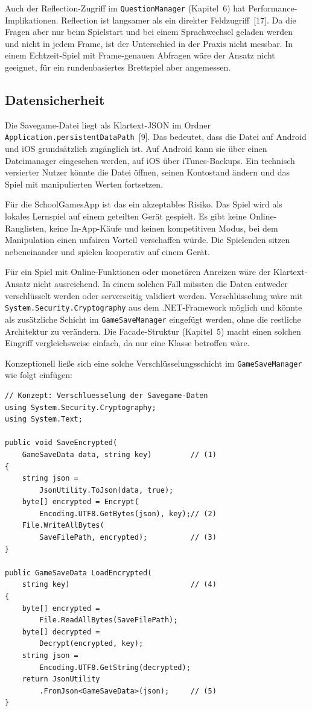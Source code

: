 \documentclass[12pt,a4paper]{article}
\begin{document}
Auch der Reflection-Zugriff im \texttt{QuestionManager} (Kapitel~6) hat Performance-Implikationen. Reflection ist langsamer als ein direkter Feldzugriff~[17]. Da die Fragen aber nur beim Spielstart und bei einem Sprachwechsel geladen werden und nicht in jedem Frame, ist der Unterschied in der Praxis nicht messbar. In einem Echtzeit-Spiel mit Frame-genauen Abfragen wäre der Ansatz nicht geeignet, für ein rundenbasiertes Brettspiel aber angemessen.

\subsection{Datensicherheit}

Die Savegame-Datei liegt als Klartext-JSON im Ordner \texttt{Application.persistentDataPath}~[9]. Das bedeutet, dass die Datei auf Android und iOS grundsätzlich zugänglich ist. Auf Android kann sie über einen Dateimanager eingesehen werden, auf iOS über iTunes-Backups. Ein technisch versierter Nutzer könnte die Datei öffnen, seinen Kontostand ändern und das Spiel mit manipulierten Werten fortsetzen.

Für die SchoolGamesApp ist das ein akzeptables Risiko. Das Spiel wird als lokales Lernspiel auf einem geteilten Gerät gespielt. Es gibt keine Online-Ranglisten, keine In-App-Käufe und keinen kompetitiven Modus, bei dem Manipulation einen unfairen Vorteil verschaffen würde. Die Spielenden sitzen nebeneinander und spielen kooperativ auf einem Gerät.

Für ein Spiel mit Online-Funktionen oder monetären Anreizen wäre der Klartext-Ansatz nicht ausreichend. In einem solchen Fall müssten die Daten entweder verschlüsselt werden oder serverseitig validiert werden. Verschlüsselung wäre mit \texttt{System.Security.Cryptography} aus dem .NET-Framework möglich und könnte als zusätzliche Schicht im \texttt{GameSaveManager} eingefügt werden, ohne die restliche Architektur zu verändern. Die Facade-Struktur (Kapitel~5) macht einen solchen Eingriff vergleichsweise einfach, da nur eine Klasse betroffen wäre.

Konzeptionell ließe sich eine solche Verschlüsselungsschicht im \texttt{GameSaveManager} wie folgt einfügen:

\begin{lstlisting}
// Konzept: Verschluesselung der Savegame-Daten
using System.Security.Cryptography;
using System.Text;

public void SaveEncrypted(
    GameSaveData data, string key)         // (1)
{
    string json =
        JsonUtility.ToJson(data, true);
    byte[] encrypted = Encrypt(
        Encoding.UTF8.GetBytes(json), key);// (2)
    File.WriteAllBytes(
        SaveFilePath, encrypted);          // (3)
}

public GameSaveData LoadEncrypted(
    string key)                            // (4)
{
    byte[] encrypted =
        File.ReadAllBytes(SaveFilePath);
    byte[] decrypted =
        Decrypt(encrypted, key);
    string json =
        Encoding.UTF8.GetString(decrypted);
    return JsonUtility
        .FromJson<GameSaveData>(json);     // (5)
}
\end{lstlisting}
\end{document}

